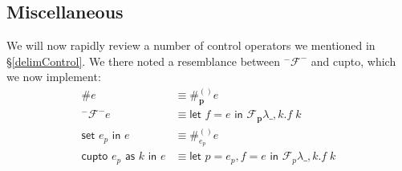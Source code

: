 \documentclass[11pt]{article}
\newcommand{\maybePage}{\newpage}
\newcommand{\abort}[2]{\textsf{abort}[#1]\;#2}
\newcommand{\letin}[2]{\textsf{let }#1\textsf{ in }#2}
\newcommand\F{\mathcal{F}}
\begin{document}
%
%
%
%

\maybePage
\subsection{Miscellaneous}

We will now rapidly review a number of control operators we mentioned in \S\ref{delimControl}.
We there noted a resemblance between $^-\F^-$ and cupto, which we now implement:
\begin{align*}
\#e &\equiv \#_\mathbf{p}^{()}e \\
^-\F^-e &\equiv
	\letin{f=e}{\F_\mathbf{p}\lambda \_,k.f\;k} \\
%
\textsf{set }e_p\textsf{ in }e &\equiv
	\#_{e_p}^{()}e \\
\textsf{cupto }e_p\textsf{ as }k\textsf{ in }e &\equiv
	\letin{p = e_p,f=e}{\F_p\lambda \_,k.f\;k} \\
\end{align*}
\end{document}
